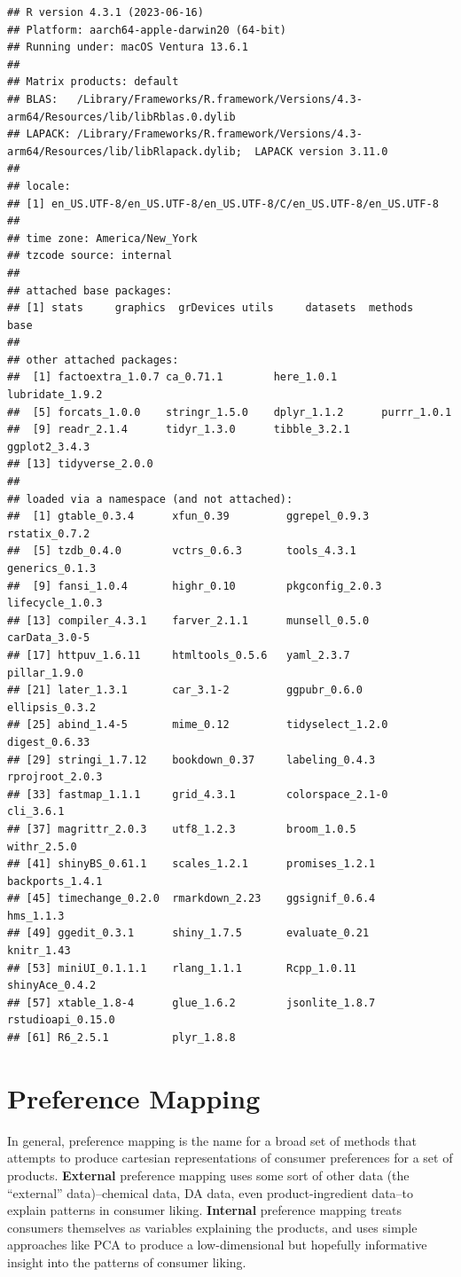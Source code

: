 \documentclass[
]{book}
\begin{document}
\begin{verbatim}
## R version 4.3.1 (2023-06-16)
## Platform: aarch64-apple-darwin20 (64-bit)
## Running under: macOS Ventura 13.6.1
## 
## Matrix products: default
## BLAS:   /Library/Frameworks/R.framework/Versions/4.3-arm64/Resources/lib/libRblas.0.dylib 
## LAPACK: /Library/Frameworks/R.framework/Versions/4.3-arm64/Resources/lib/libRlapack.dylib;  LAPACK version 3.11.0
## 
## locale:
## [1] en_US.UTF-8/en_US.UTF-8/en_US.UTF-8/C/en_US.UTF-8/en_US.UTF-8
## 
## time zone: America/New_York
## tzcode source: internal
## 
## attached base packages:
## [1] stats     graphics  grDevices utils     datasets  methods   base     
## 
## other attached packages:
##  [1] factoextra_1.0.7 ca_0.71.1        here_1.0.1       lubridate_1.9.2 
##  [5] forcats_1.0.0    stringr_1.5.0    dplyr_1.1.2      purrr_1.0.1     
##  [9] readr_2.1.4      tidyr_1.3.0      tibble_3.2.1     ggplot2_3.4.3   
## [13] tidyverse_2.0.0 
## 
## loaded via a namespace (and not attached):
##  [1] gtable_0.3.4      xfun_0.39         ggrepel_0.9.3     rstatix_0.7.2    
##  [5] tzdb_0.4.0        vctrs_0.6.3       tools_4.3.1       generics_0.1.3   
##  [9] fansi_1.0.4       highr_0.10        pkgconfig_2.0.3   lifecycle_1.0.3  
## [13] compiler_4.3.1    farver_2.1.1      munsell_0.5.0     carData_3.0-5    
## [17] httpuv_1.6.11     htmltools_0.5.6   yaml_2.3.7        pillar_1.9.0     
## [21] later_1.3.1       car_3.1-2         ggpubr_0.6.0      ellipsis_0.3.2   
## [25] abind_1.4-5       mime_0.12         tidyselect_1.2.0  digest_0.6.33    
## [29] stringi_1.7.12    bookdown_0.37     labeling_0.4.3    rprojroot_2.0.3  
## [33] fastmap_1.1.1     grid_4.3.1        colorspace_2.1-0  cli_3.6.1        
## [37] magrittr_2.0.3    utf8_1.2.3        broom_1.0.5       withr_2.5.0      
## [41] shinyBS_0.61.1    scales_1.2.1      promises_1.2.1    backports_1.4.1  
## [45] timechange_0.2.0  rmarkdown_2.23    ggsignif_0.6.4    hms_1.1.3        
## [49] ggedit_0.3.1      shiny_1.7.5       evaluate_0.21     knitr_1.43       
## [53] miniUI_0.1.1.1    rlang_1.1.1       Rcpp_1.0.11       shinyAce_0.4.2   
## [57] xtable_1.8-4      glue_1.6.2        jsonlite_1.8.7    rstudioapi_0.15.0
## [61] R6_2.5.1          plyr_1.8.8
\end{verbatim}

\chapter{Preference Mapping}\label{preference-mapping}

In general, preference mapping is the name for a broad set of methods that attempts to produce cartesian representations of consumer preferences for a set of products. \textbf{External} preference mapping uses some sort of other data (the ``external'' data)--chemical data, DA data, even product-ingredient data--to explain patterns in consumer liking. \textbf{Internal} preference mapping treats consumers themselves as variables explaining the products, and uses simple approaches like PCA to produce a low-dimensional but hopefully informative insight into the patterns of consumer liking.
\end{document}
